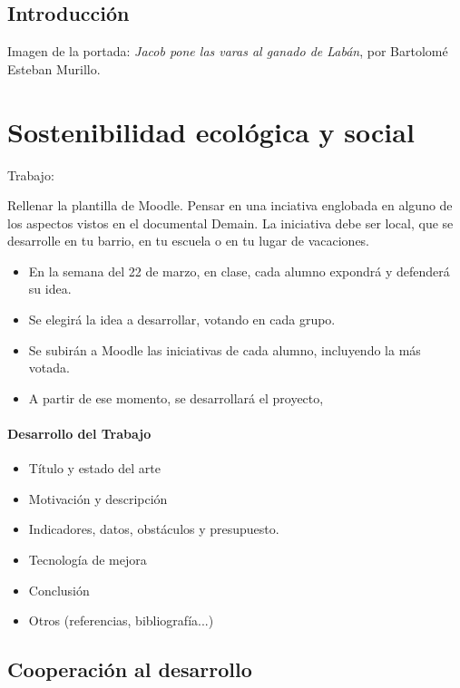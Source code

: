 \documentclass[a4paper]{book}
\begin{document}
\newpage
{}
{}
\section*{Introducción}
Imagen de la portada: \textsl{Jacob pone las varas al ganado de Labán}, por Bartolomé Esteban Murillo.
\newpage

\setlength{\parskip}{0em}
\tableofcontents 
\setlength{\parskip}{0.5em}

\chapter{Sostenibilidad ecológica y social}

Trabajo:

Rellenar la plantilla de Moodle. Pensar en una inciativa englobada en alguno de los aspectos vistos en el documental Demain. La iniciativa debe ser local, que se desarrolle en tu barrio, en tu escuela o en tu lugar de vacaciones.

\begin{itemize}
	 \item En la semana del 22 de marzo, en clase, cada alumno expondrá y defenderá su idea.
	 \item Se elegirá la idea a desarrollar, votando en cada grupo.
	 \item Se subirán a Moodle las iniciativas de cada alumno, incluyendo la más votada.
	 \item A partir de ese momento, se desarrollará el proyecto,
\end{itemize}

\subsubsection{Desarrollo del Trabajo}
\begin{itemize}
	\item Título y estado del arte
	\item Motivación y descripción
	\item Indicadores, datos, obstáculos y presupuesto.
	\item Tecnología de mejora
	\item Conclusión
	\item Otros (referencias, bibliografía...)
\end{itemize}


\section{Cooperación al desarrollo}
\end{document}
